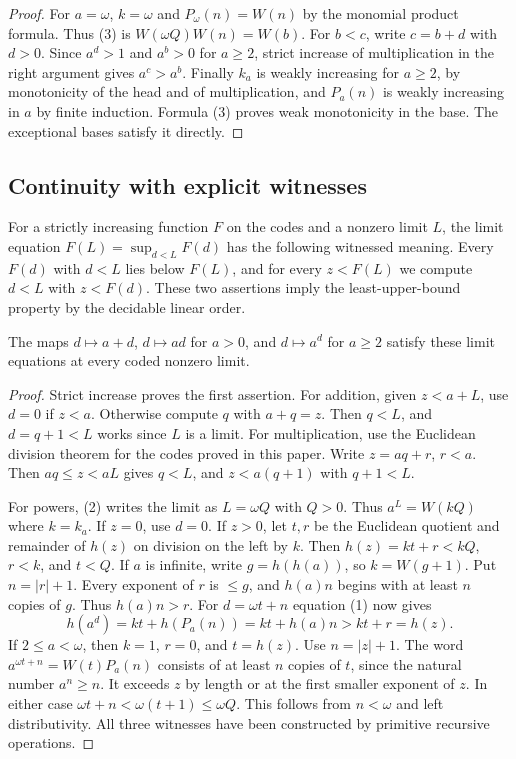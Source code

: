 \begin{proof}
For $a=\omega$, $k=\omega$ and $P_\omega(n)=W(n)$ by the monomial
product formula. Thus (3) is $W(\omega Q)W(n)=W(b)$. For $b<c$, write
$c=b+d$ with $d>0$. Since $a^d>1$ and $a^b>0$ for $a\ge2$, strict
increase of multiplication in the right argument gives $a^c>a^b$.
Finally $k_a$ is weakly increasing for $a\ge2$, by monotonicity of the
head and of multiplication, and $P_a(n)$ is weakly increasing in $a$
by finite induction. Formula (3) proves weak monotonicity in the base.
The exceptional bases satisfy it directly.
\end{proof}

\subsection{Continuity with explicit witnesses}
For a strictly increasing function $F$ on the codes and a nonzero limit
$L$, the limit equation $F(L)=\sup_{d<L}F(d)$ has the following
witnessed meaning. Every $F(d)$ with $d<L$ lies below $F(L)$, and for
every $z<F(L)$ we compute $d<L$ with $z<F(d)$. These two assertions
imply the least-upper-bound property by the decidable linear order.

\begin{theorem}\label{th:ordinary-cont}
The maps $d\mapsto a+d$, $d\mapsto ad$ for $a>0$, and $d\mapsto a^d$
for $a\ge2$ satisfy these limit equations at every coded nonzero limit.
\end{theorem}
\begin{proof}
Strict increase proves the first assertion. For addition, given
$z<a+L$, use $d=0$ if $z<a$. Otherwise compute $q$ with $a+q=z$. Then $q<L$, and $d=q+1<L$ works since $L$ is a limit.
For multiplication, use the Euclidean division theorem for the codes
proved in this paper. Write $z=aq+r$, $r<a$. Then $aq\le z<aL$ gives
$q<L$, and $z<a(q+1)$ with $q+1<L$.

For powers, (2) writes the limit as $L=\omega Q$ with $Q>0$. Thus
$a^L=W(kQ)$ where $k=k_a$. If $z=0$, use $d=0$. If $z>0$, let
$t,r$ be the Euclidean quotient and remainder of $h(z)$ on division
on the left by $k$. Then $h(z)=kt+r<kQ$, $r<k$, and $t<Q$.
If $a$ is infinite, write $g=h(h(a))$, so $k=W(g+1)$. Put
$n=|r|+1$. Every exponent of $r$ is $\le g$, and $h(a)n$ begins with
at least $n$ copies of $g$. Thus $h(a)n>r$. For $d=\omega t+n$
equation (1) now gives
\[
 h(a^d)=kt+h(P_a(n))=kt+h(a)n>kt+r=h(z).
\]
If $2\le a<\omega$, then $k=1$, $r=0$, and $t=h(z)$. Use
$n=|z|+1$. The word $a^{\omega t+n}=W(t)P_a(n)$ consists of
at least $n$ copies of $t$, since the natural number $a^n\ge n$.
It exceeds $z$ by length or at the first smaller exponent of $z$.
In either case $\omega t+n<\omega(t+1)\le\omega Q$. This follows
from $n<\omega$ and left distributivity. All three witnesses have
been constructed by primitive recursive operations.
\end{proof}

